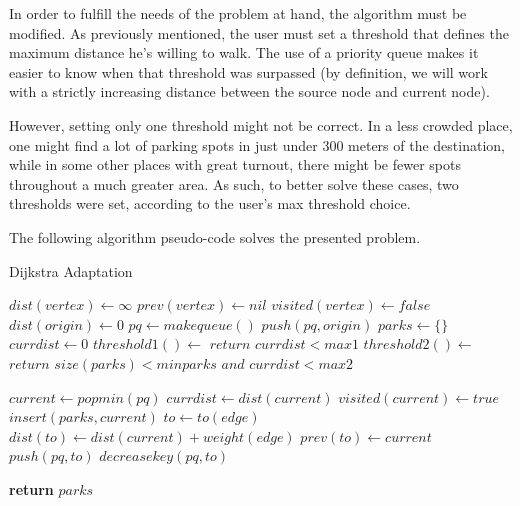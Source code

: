 \documentclass[a4paper, 12pt]{report}
\begin{document}
    In order to fulfill the needs of the problem at hand, the algorithm must be modified. As previously mentioned, the user must set a threshold that defines the maximum distance he's willing to walk. The use of a priority queue makes it easier to know when that threshold was surpassed (by definition, we will work with a strictly increasing distance between the source node and current node). 
    
    However, setting only one threshold might not be correct. In a less crowded place, one might find a lot of parking spots in just under 300 meters of the destination, while in some other places with great turnout, there might be fewer spots throughout a much greater area. As such, to better solve these cases, two thresholds were set, according to the user's max threshold choice.
    
    \pagebreak
    
    The following algorithm pseudo-code solves the presented problem.
    
    \begin{algorithm}[H]
    	\caption{Dijkstra Adaptation} 
	    \begin{algorithmic}[1]
		    \State $dist(vertex) \leftarrow \infty$
		    \State $prev(vertex) \leftarrow nil$
		    \State $visited(vertex) \leftarrow false$
		\EndFor
		\State $dist(origin) \leftarrow 0$
		\State $pq \leftarrow makequeue()$
		\State $push(pq, origin)$
		\State
		\State $parks \leftarrow \{\}$
		\State $currdist \leftarrow 0$
		\State $threshold1() \leftarrow $ $return$ $currdist < max1$
		\State $threshold2() \leftarrow $ $return$ $size(parks) < minparks$ $and$ $currdist < max2$
		\State
		
		    \State $current \leftarrow popmin(pq)$
		    \State $currdist \leftarrow dist(current)$
		    \State $visited(current) \leftarrow true$
		        \State $insert(parks, current)$
		    \EndIf
		        \State $to \leftarrow to(edge)$
		            \State $dist(to) \leftarrow dist(current) + weight(edge)$
		            \State $prev(to) \leftarrow current$
		                \State $push(pq, to)$
		            \Else
		                \State $decreasekey(pq, to)$
		            \EndIf
		        \EndIf
		    \EndFor
		\EndWhile
		
		\State \textbf{return} $parks$
	    \end{algorithmic} 
    \end{algorithm}
    
\end{document}
